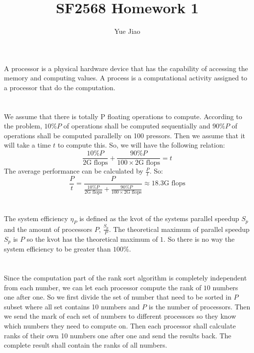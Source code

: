 \documentclass[a4paper]{article}
\title{SF2568 Homework 1}
\author{Yue Jiao}
\date{}
\begin{document}
\maketitle

\section{} %
A processor is a physical hardware device that has the capability of accessing the memory and computing values.
A process is a computational activity assigned to a processor that do the computation.

\section{} %
We assume that there is totally P floating operations to compute.
According to the problem, $10\%P$ of operations shall be computed sequentially and $90\%P$ of operations shall be computed parallelly on 100 pressors.
Then we assume that it will take a time $t$ to compute this.
So, we will have the following relation:
\[
\frac{10\%P}{2\text{G flops}} + \frac{90\%P}{100\times2\text{G flops}} = t
\]
The average performance can be calculated by $\frac{P}{t}$. So:
\[
\frac{P}{t}=\frac{P}{\frac{10\%P}{2\text{G flops}} + \frac{90\%P}{100\times2\text{G flops}}} \approx 18.3\text{G flops}
\]


\section{} %
The system efficiency $\eta_P$ is defined as the kvot of the systems parallel speedup $S_p$ and the amount of processors $P$, $\frac{S_p}{P}$.
The theoretical maximum of parallel speedup $S_p$ is $P$ so the kvot has the theoretical maximum of $1$.
So there is no way the system efficiency to be greater than $100\%$.

\section{} %
Since the computation part of the rank sort algorithm is completely independent from each number, we can let each processor compute the rank of $10$ numbers one after one. 
So we first divide the set of number that need to be sorted in $P$ subset where all set contains 10 numbers and $P$ is the number of processors.
Then we send the mark of each set of numbers to different processors so they know which numbers they need to compute on.
Then each processor shall calculate ranks of their own 10 numbers one after one and send the results back.
The complete result shall contain the ranks of all numbers.
\end{document}
